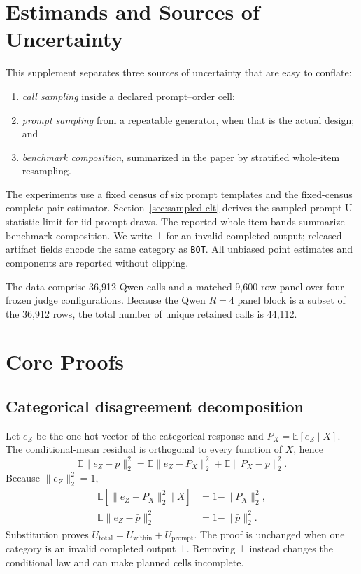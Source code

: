 \documentclass[letterpaper]{article}
\newcommand{\E}{\mathbb E}
\newcommand{\1}{\mathbf 1}
\newcommand{\Up}{U_{\mathrm{prompt}}}
\newcommand{\Uw}{U_{\mathrm{within}}}
\newcommand{\Ut}{U_{\mathrm{total}}}
\begin{document}
\section{Estimands and Sources of Uncertainty}

This supplement separates three sources of uncertainty that are easy to
conflate:
\begin{enumerate}
    \item \emph{call sampling} inside a declared prompt--order cell;
    \item \emph{prompt sampling} from a repeatable generator, when that is the
    actual design; and
    \item \emph{benchmark composition}, summarized in the paper by
    stratified whole-item resampling.
\end{enumerate}
The experiments use a fixed census of six prompt templates and the
fixed-census complete-pair estimator. Section~\ref{sec:sampled-clt} derives the
sampled-prompt U-statistic limit for iid prompt draws. The reported whole-item
bands summarize benchmark composition. We write $\bot$ for an invalid
completed output; released artifact fields encode the same category as
\texttt{BOT}. All unbiased point estimates and components are reported
without clipping.

The data comprise 36,912 Qwen calls and a matched 9,600-row panel over four
frozen judge configurations. Because the Qwen $R=4$ panel block is a subset of
the 36,912 rows, the total number of unique retained calls is 44,112.

\section{Core Proofs}

\subsection{Categorical disagreement decomposition}

Let $e_Z$ be the one-hot vector of the categorical response and
$P_X=\E[e_Z\mid X]$. The conditional-mean residual is orthogonal to every
function of $X$, hence
\begin{equation}
\E\|e_Z-\bar p\|_2^2
=\E\|e_Z-P_X\|_2^2+\E\|P_X-\bar p\|_2^2.
\label{eq:s-total-variance}
\end{equation}
Because $\|e_Z\|_2^2=1$,
\begin{align}
\E[\|e_Z-P_X\|_2^2\mid X]&=1-\|P_X\|_2^2,\\
\E\|e_Z-\bar p\|_2^2&=1-\|\bar p\|_2^2.
\end{align}
Substitution proves
$\Ut=\Uw+\Up$. The proof is unchanged when one category is an invalid
completed output $\bot$. Removing $\bot$ instead changes the conditional law
and can make planned cells incomplete.
\end{document}
